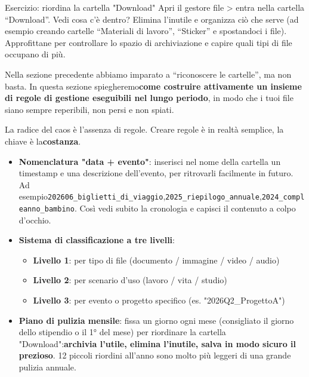 \begin{tcbpractice}{Esercizio: riordina la cartella "Download"}
Apri il gestore file > entra nella cartella “Download”. Vedi cosa c'è dentro? Elimina l'inutile e organizza ciò che serve (ad esempio creando cartelle “Materiali di lavoro”, “Sticker” e spostandoci i file). Approfittane per controllare lo spazio di archiviazione e capire quali tipi di file occupano di più.

\end{tcbpractice}


Nella sezione precedente abbiamo imparato a “riconoscere le cartelle”, ma non basta. In questa sezione spiegheremo\textbf{come costruire attivamente un insieme di regole di gestione eseguibili nel lungo periodo}, in modo che i tuoi file siano sempre reperibili, non persi e non spiati.


La radice del caos è l'assenza di regole. Creare regole è in realtà semplice, la chiave è la\textbf{costanza}.

\begin{itemize}
  \item \textbf{Nomenclatura "data + evento"}: inserisci nel nome della cartella un timestamp e una descrizione dell'evento, per ritrovarli facilmente in futuro. Ad esempio\texttt{202606\_biglietti\_di\_viaggio},\texttt{2025\_riepilogo\_annuale},\texttt{2024\_compleanno\_bambino}. Così vedi subito la cronologia e capisci il contenuto a colpo d'occhio.
  \item \textbf{Sistema di classificazione a tre livelli}:
  \begin{itemize}
    \item \textbf{Livello 1}: per tipo di file (documento / immagine / video / audio)
    \item \textbf{Livello 2}: per scenario d'uso (lavoro / vita / studio)
    \item \textbf{Livello 3}: per evento o progetto specifico (es. "2026Q2\_ProgettoA")
  \end{itemize}
  \item \textbf{Piano di pulizia mensile}: fissa un giorno ogni mese (consigliato il giorno dello stipendio o il 1° del mese) per riordinare la cartella "Download":\textbf{archivia l'utile, elimina l'inutile, salva in modo sicuro il prezioso}. 12 piccoli riordini all'anno sono molto più leggeri di una grande pulizia annuale.
\end{itemize}

